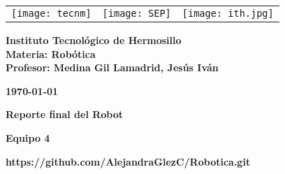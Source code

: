 \begin{titlepage}
	\centering
	\begin{tabular}{@{}p{} p{} p{}@{}}
		\texttt{[image: tecnm]} & 
		\centering \texttt{[image: SEP]} & 
		\raggedleft \texttt{[image: ith.jpg]} \\
	\end{tabular}
	
	\vspace{2em}
	
	\noindent
	\begin{minipage}[t]{0.6\textwidth}
		\raggedright
		\small \textbf{%
			Instituto Tecnológico de Hermosillo\\
			Materia: Robótica\\
			Profesor: Medina Gil Lamadrid, Jesús Iván%
		}
	\end{minipage}%
	\hfill
	\begin{minipage}[t]{0.3\textwidth}
		\raggedleft
		\small \textbf{\today}
	\end{minipage}
	
	\vspace{2em}
	
	{\Huge \textbf{Reporte final del Robot}}
		
	\vspace{1em}
	
	\begin{center}
		{\Large \textbf{Equipo 4}}
		
		{\small \textbf{https://github.com/AlejandraGlezC/Robotica.git}}
	\end{center}
	
	\vspace{1em}
	

\end{titlepage}
